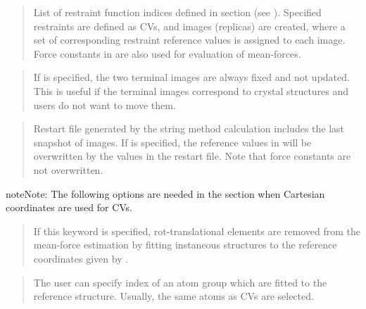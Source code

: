 \documentclass[a4paper,11pt,oneside,english]{sphinxmanual}
\begin{document}
 
\begin{quote}


List of restraint function indices
defined in \sphinxstylestrong{{[}RESTRAINTS{]}} section (see {\hyperref[\detokenize{12_Restraints:restraints}]{}}).
Specified restraints are defined as CVs, and  images
(replicas) are created, where a set of corresponding restraint
reference values is assigned to each image.
Force constants in \sphinxstylestrong{{[}RESTRAINTS{]}} are also used for evaluation
of mean-forces.
\end{quote}

 
\begin{quote}


If  is specified, the two terminal images are
always fixed and not updated. This is useful if the terminal images
correspond to crystal structures and users do not want to move them.
\end{quote}

 
\begin{quote}


Restart file generated by the string method calculation includes the
last snapshot of images. If  is specified,
the reference values in \sphinxstylestrong{{[}RESTRAINTS{]}} will be overwritten by
the values in the restart file. Note that force constants are not
overwritten.
\end{quote}

\begin{sphinxadmonition}{note}{Note:}
The following options are needed in the \sphinxstylestrong{{[}FITTING{]}} section when
Cartesian coordinates are used for CVs.

 
\begin{quote}

If this keyword is specified, rot-translational elements are
removed from the mean-force estimation by fitting instaneous
structures to the reference coordinates given by .
\end{quote}

 
\begin{quote}

The user can specify index of an atom group which are fitted
to the reference structure.
Usually, the same atoms as CVs are selected.
\end{quote}
\end{sphinxadmonition}
\end{document}
